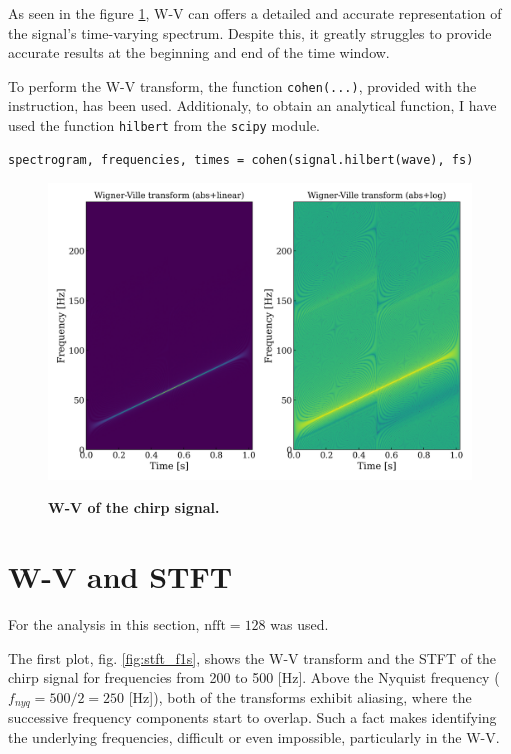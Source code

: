 \documentclass[13pt,a4paper]{article}
\begin{document}
As seen in the figure \ref{fig:wv}, W-V can offers a detailed and accurate representation of the signal's time-varying spectrum. Despite this, it greatly struggles to provide accurate results at the beginning and end of the time window.

To perform the W-V transform, the function \verb|cohen(...)|, provided with the instruction, has been used. Additionaly, to obtain an analytical function, I have used the function \verb|hilbert| from the \verb|scipy| module.

\begin{lstlisting}[caption={\textbf{Snippet for generating the W-V transform.}}]
spectrogram, frequencies, times = cohen(signal.hilbert(wave), fs)
\end{lstlisting}

\begin{figure}[ht!]
    \centering
    \caption{\textbf{W-V of the chirp signal.}}
    \includegraphics[width=\linewidth]{cohen.png}
    \label{fig:wv}
\end{figure}
\pagebreak


\section{W-V and STFT}

For the analysis in this section, $\text{nfft}=128$ was used.

The first plot, fig. \ref{fig:stft_f1s}, shows the W-V transform and the STFT of the chirp signal for frequencies from 200 to 500 [Hz]. Above the Nyquist frequency ($f_{nyq}=500/2=250$ [Hz]), both of the transforms exhibit aliasing, where the successive frequency components start to overlap. Such a fact makes identifying the underlying frequencies, difficult or even impossible, particularly in the W-V.
\end{document}
